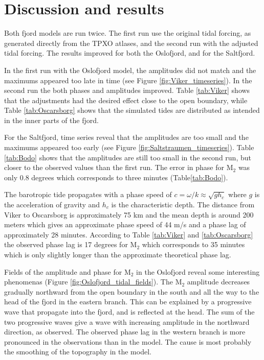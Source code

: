\section{Discussion and results}

Both fjord models are run twice. The first run use the original tidal forcing, as generated directly from the TPXO atlases, and the second run with the adjusted tidal forcing. The results improved for both the Oslofjord, and for the Saltfjord. 

In the first run with the Oslofjord model, the amplitudes did not match and the maximums appeared too late in time (see Figure \ref{fig:Viker_timeseries}). In the second run the both phases and amplitudes improved. Table \ref{tab:Viker} shows that the adjustments had the desired effect close to the open boundary, while Table \ref{tab:Oscarsborg} shows that the simulated tides are distributed as intended in the inner parts of the fjord. 

For the Saltfjord, time series reveal that the amplitudes are too small and the maximums appeared too early (see Figure \ref{fig:Saltstraumen_timeseries}). Table \ref{tab:Bodo} shows that the amplitudes are still too small in the second run, but closer to the observed values than the first run. The error in phase for M$_2$ was only $0.8$ degrees which corresponds to three minutes (Table\-\ref{tab:Bodo}).

The barotropic tide propagates with a phase speed of $c = \omega/k \approx \sqrt{g h_c}$ where $g$ is the acceleration of gravity and $h_c$ is the characteristic depth. The distance from Viker to Oscarsborg is approximately 75 km and the mean depth is around 200 meters which gives an approximate phase speed of 44 m/s and a phase lag of approximately 28 minutes. According to Table \ref{tab:Viker} and \ref{tab:Oscarsborg} the observed phase lag is 17 degrees for M$_2$ which corresponds to 35 minutes which is only slightly longer than the approximate theoretical phase lag. 

Fields of the amplitude and phase for M$_2$ in the Oslofjord reveal some interesting phenomenas (Figure \ref{fig:Oslofjord_tidal_fields}). 
The M$_2$ amplitude decreases gradually northward from the open boundary in the south and all the way to the head of the fjord in the eastern branch. 
This can be explained by a progressive wave that propagate into the fjord, and is reflected at the head.
The sum of the two progressive waves give a wave with increasing amplitude in the northward direction, as observed. The observed phase lag in the western branch is more pronounced in the observations than in the model. The cause is most probably the smoothing of the topography in the model.

